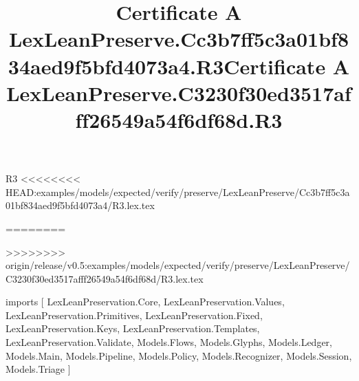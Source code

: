 \begin{lexlean}{R3}
<<<<<<<< HEAD:examples/models/expected/verify/preserve/LexLeanPreserve/Cc3b7ff5c3a01bf834aed9f5bfd4073a4/R3.lex.tex
\title{Certificate A LexLeanPreserve.Cc3b7ff5c3a01bf834aed9f5bfd4073a4.R3}
========
\title{Certificate A LexLeanPreserve.C3230f30ed3517afff26549a54f6df68d.R3}
>>>>>>>> origin/release/v0.5:examples/models/expected/verify/preserve/LexLeanPreserve/C3230f30ed3517afff26549a54f6df68d/R3.lex.tex
\begin{coremodule}
imports [
  LexLeanPreservation.Core,
  LexLeanPreservation.Values,
  LexLeanPreservation.Primitives,
  LexLeanPreservation.Fixed,
  LexLeanPreservation.Keys,
  LexLeanPreservation.Templates,
  LexLeanPreservation.Validate,
  Models.Flows,
  Models.Glyphs,
  Models.Ledger,
  Models.Main,
  Models.Pipeline,
  Models.Policy,
  Models.Recognizer,
  Models.Session,
  Models.Triage
]


\end{coremodule}
\end{lexlean}
